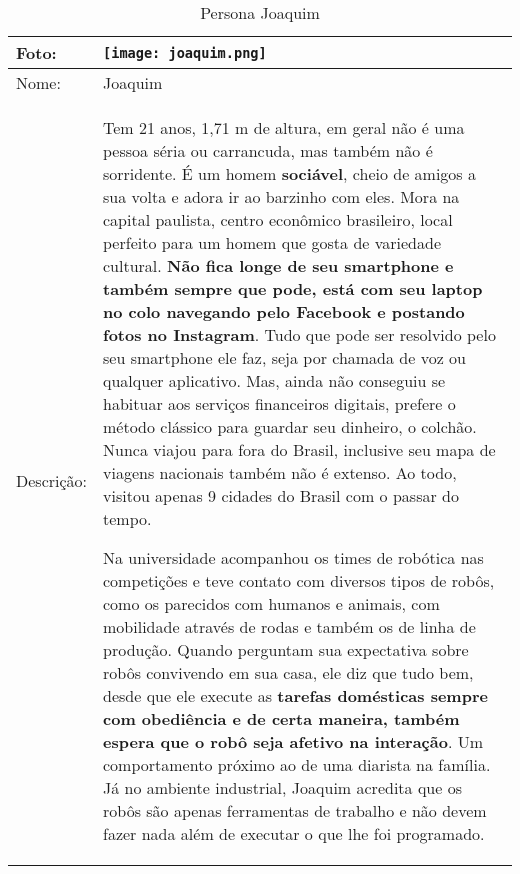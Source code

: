 \begin{table}[!ht]
	\caption{Persona Joaquim}
	\label{tab:joaquim}
	\centering
	\begin{tabular}{ m{2 cm} | m{13cm} }
		\hline
		Foto: & \rule{0cm}{2.7cm} \texttt{[image: joaquim.png]} \\
		\hline
		Nome: & Joaquim \\
		\hline
		Descrição: & Tem 21 anos, 1,71 m de altura, em geral não é uma pessoa séria ou carrancuda, mas também não é sorridente. É um homem \textbf{sociável}, cheio de amigos a sua volta e adora ir ao barzinho com eles. Mora na capital paulista, centro econômico brasileiro, local perfeito para um homem que gosta de variedade cultural. \textbf{Não fica longe de seu smartphone e também sempre que pode, está com seu laptop no colo navegando pelo Facebook e postando fotos no Instagram}. Tudo que pode ser resolvido pelo seu smartphone ele faz, seja por chamada de voz ou qualquer aplicativo. Mas, ainda não conseguiu se habituar aos serviços financeiros digitais, prefere o método clássico para guardar seu dinheiro, o colchão. Nunca viajou para fora do Brasil, inclusive seu mapa de viagens nacionais também não é extenso. Ao todo, visitou apenas 9 cidades do Brasil com o passar do tempo.

		Na universidade acompanhou os times de robótica nas competições e teve contato com diversos tipos de robôs, como os parecidos com humanos e animais, com mobilidade através de rodas e também os de linha de produção. Quando perguntam sua expectativa sobre robôs convivendo em sua casa, ele diz que tudo bem, desde que ele execute as \textbf{tarefas domésticas sempre com obediência e de certa maneira, também espera que o robô seja afetivo na interação}. Um comportamento próximo ao de uma diarista na família. Já no ambiente industrial, Joaquim acredita que os robôs são apenas ferramentas de trabalho e não devem fazer nada além de executar o que lhe foi programado. \\
		\hline
	\end{tabular}
\end{table}

